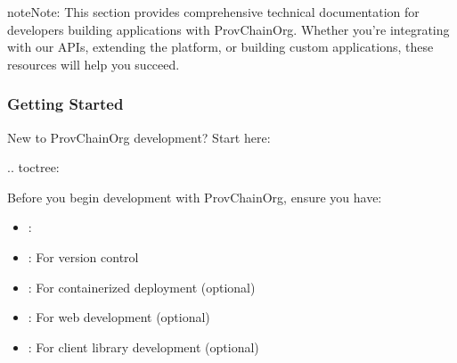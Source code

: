 \documentclass[letterpaper,10pt,english]{sphinxmanual}
\begin{document}
\begin{sphinxadmonition}{note}{Note:}
\sphinxAtStartPar
This section provides comprehensive technical documentation for developers building applications with ProvChainOrg. Whether you’re integrating with our APIs, extending the platform, or building custom applications, these resources will help you succeed.
\end{sphinxadmonition}


\subsubsection{Getting Started}
\label{\detokenize{developer/index:getting-started}}
\sphinxAtStartPar
New to ProvChainOrg development? Start here:

\sphinxAtStartPar
{}
.. toctree:

\begin{sphinxVerbatim}[commandchars=\\\{\}]
 
  

\end{sphinxVerbatim}

\sphinxAtStartPar
{}
Before you begin development with ProvChainOrg, ensure you have:
\begin{itemize}
\item {} 
\sphinxAtStartPar
{}: 

\item {} 
\sphinxAtStartPar
{}: For version control

\item {} 
\sphinxAtStartPar
{}: For containerized deployment (optional)

\item {} 
\sphinxAtStartPar
{}: For web development (optional)

\item {} 
\sphinxAtStartPar
{}: For client library development (optional)

\end{itemize}
\end{document}
